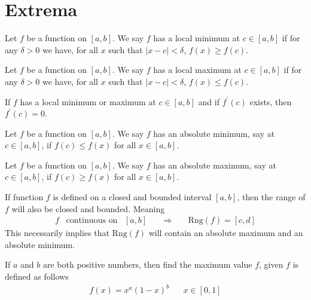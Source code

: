 \newpage
\section{Extrema}

\begin{definition}
Let $f$ be a function on $[a, b]$. We say $f$ has a local minimum at $c \in [a, b]$ if for any $\delta > 0$ we have, for all $x$ such that $\lvert x - c \rvert < \delta$, $f(x) \geq f(c)$.
\end{definition}

\begin{definition}
Let $f$ be a function on $[a, b]$. We say $f$ has a local maximum at $c \in [a, b]$ if for any $\delta > 0$ we have, for all $x$ such that $\lvert x - c \rvert < \delta$, $f(x) \leq f(c)$.
\end{definition}

\begin{theorem}
If $f$ has a local minimum or maximum at $c \in [a, b]$ and if $f^{'}(c)$ exists, then $f^{'}(c) = 0$.
\end{theorem}

\begin{definition}
Let $f$ be a function on $[a, b]$. We say $f$ has an absolute minimum, say at $c \in [a, b]$, if $f(c) \leq f(x)$ for all $x \in [a, b]$.
\end{definition}

\begin{definition}
Let $f$ be a function on $[a, b]$. We say $f$ has an absolute maximum, say at $c \in [a, b]$, if $f(c) \geq f(x)$ for all $x \in [a, b]$.
\end{definition}

\begin{theorem}
If function $f$ is defined on a closed and bounded interval $[a, b]$, then the range of $f$ will also be closed and bounded. Meaning
\begin{align*}
    f \hspace{10pt} \text{continuous on} \hspace{10pt} [a, b] \hspace{20pt} \Longrightarrow \hspace{20pt} \text{Rng}(f) = [c, d]
\end{align*}
This necessarily implies that $\text{Rng}(f)$ will contain an absolute maximum and an absolute minimum.
\end{theorem}

\begin{exercise}
If $a$ and $b$ are both positive numbers, then find the maximum value $f$, given $f$ is defined as follows
\begin{align*}
    f(x) = x^{a}(1-x)^{b} \hspace{20pt} x \in [0, 1]
\end{align*}
\end{exercise}


